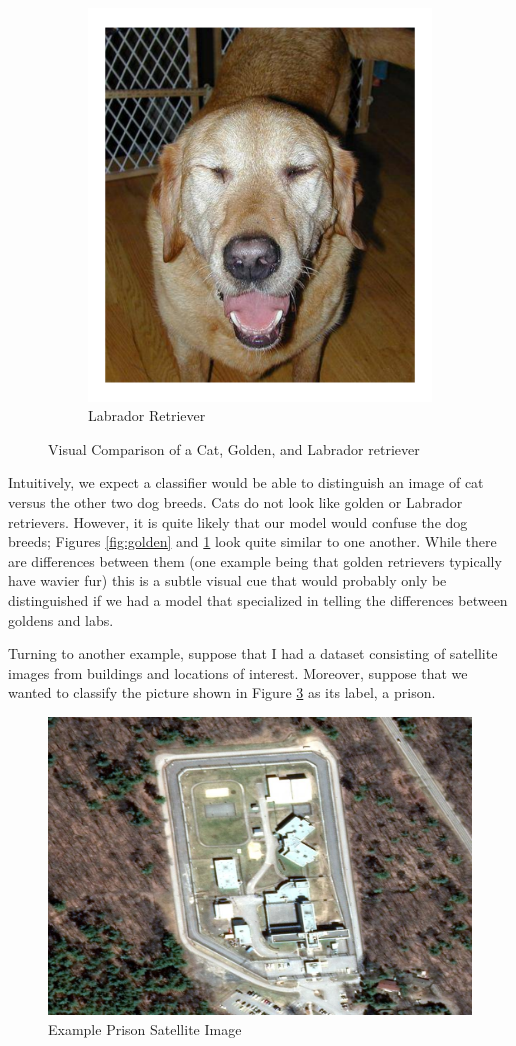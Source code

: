 \documentclass[draft, ../thesis.tex]{subfiles}
\begin{document}
\begin{figure}
\begin{subfigure}[b]{.3\linewidth}
    		\includegraphics[width=.7\linewidth]{images/lab}
    		\caption{Labrador Retriever}
    		\label{fig:lab}
    	\end{subfigure}
    	\caption{Visual Comparison of a Cat, Golden, and Labrador retriever}
    	\label{fig:animal_compare}
    \end{figure}
    
    Intuitively, we expect a classifier would be able to distinguish an image of cat versus the other two dog breeds. Cats do not look like golden or Labrador retrievers. However, it is quite likely that our model would confuse the dog breeds; Figures \ref{fig:golden} and \ref{fig:lab} look quite similar to one another. While there are differences between them (one example being that golden retrievers typically have wavier fur) this is a subtle visual cue that would probably only be distinguished if we had a model that specialized in telling the differences between goldens and labs.
    
    Turning to another example, suppose that I had a dataset consisting of satellite images from buildings and locations of interest. Moreover, suppose that we wanted to classify the picture shown in Figure \ref{fig:prison01rgb} as its label, a prison.
    
    \begin{figure}
    	\centering
    	\includegraphics[width=0.7\linewidth]{images/prison_0_1_rgb}
    	\caption{Example Prison Satellite Image}
    	\label{fig:prison01rgb}
    \end{figure}
    
\end{document}
